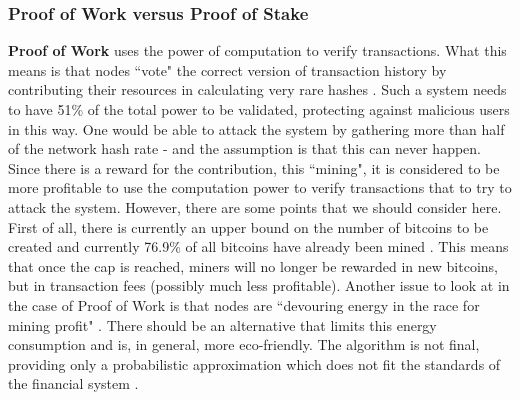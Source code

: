 \documentclass[12pt,twoside]{article}
\begin{document}
\subsubsection{Proof of Work versus Proof of Stake}
\label{sub:powpos}
\textbf{Proof of Work} uses the power of computation to verify transactions. What this means is that nodes ``vote" the correct version of transaction history by contributing their resources in calculating very rare hashes \cite{PWPS}. Such a system needs to have 51\% of the total power to be validated, protecting against malicious users in this way. One would be able to attack the system by gathering more than half of the network hash rate - and the assumption is that this can never happen. Since there is a reward for the contribution, this ``mining", it is considered to be more profitable to use the computation power to verify transactions that to try to attack the system. However, there are some points that we should consider here. First of all, there is currently an upper bound on the number of bitcoins to be created and currently 76.9\% of all bitcoins have already been mined \cite{BC:UB}. This means that once the cap is reached, miners will no longer be rewarded in new bitcoins, but in transaction fees (possibly much less profitable). Another issue to look at in the case of Proof of Work is that nodes are ``devouring energy in the race for mining profit" \cite{PoW}. There should be an alternative that limits this energy consumption and is, in general, more eco-friendly. The algorithm is not final, providing only a probabilistic approximation which does not fit the standards of the financial system \cite{Corda:TP}.
\\ \\
\end{document}
